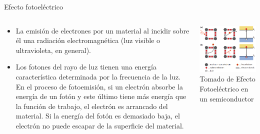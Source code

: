 \documentclass[aspectratio=169]{beamer}
\begin{document}
\begin{frame}{Efecto fotoeléctrico}
    \begin{columns}[c, onlytextwidth]
        \begin{column}{0.55\textwidth}
            \begin{itemize}
                \item La emisión de electrones por un material al incidir sobre él una radiación electromagnética (luz visible o ultravioleta, en general).
                \item Los fotones del rayo de luz tienen una energía característica determinada por la frecuencia de la luz. En el proceso de fotoemisión, si un electrón absorbe la energía de un fotón y este último tiene más energía que la función de trabajo, el electrón es arrancado del material. Si la energía del fotón es demasiado baja, el electrón no puede escapar de la superficie del material.

            \end{itemize}
        \end{column}
        \begin{column}{0.45\textwidth}
            \centering
    \includegraphics[width = 1\linewidth]{fig/Optica/Fotoefecto.png}\\
            \tiny{Tomado de \cite{Fraden_2016}}
            \tiny{Efecto Fotoeléctrico en un semiconductor}
        \end{column}
    \end{columns}
\end{frame}
\end{document}
